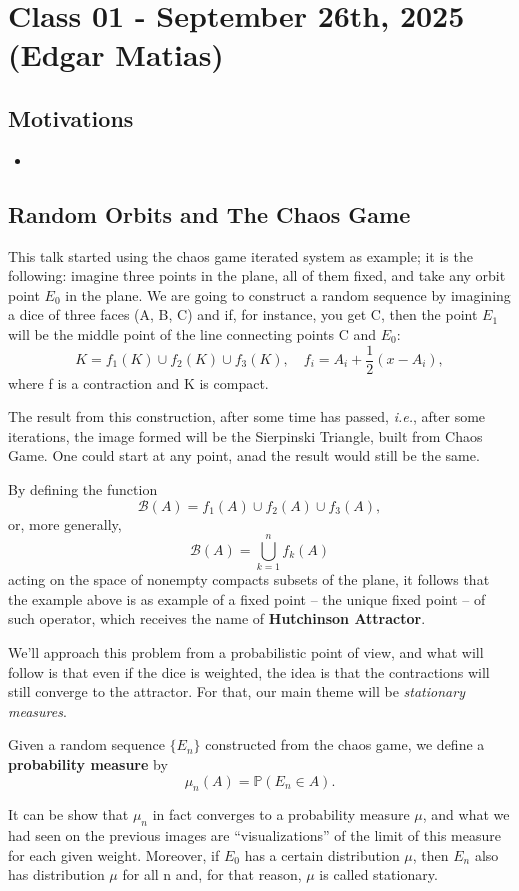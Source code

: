 \documentclass[../stationary_ifs.tex]{subfiles}
\begin{document}
\section{Class 01 - September 26th, 2025 (Edgar Matias)}
\subsection{Motivations}
\begin{itemize}
	\item
\end{itemize}
\subsection{Random Orbits and The Chaos Game}
This talk started using the chaos game iterated system as example; it is the following: imagine three points in the plane, all of them fixed,
and take any orbit point \(E_{0}\) in the plane. We are going to construct a random sequence by imagining a dice of three faces (A, B, C) and if, for instance, you get
C, then the point \(E_1\) will be the middle point of the line connecting points C and \(E_{0}\):
\[
	K =f_1(K)\cup f_2(K)\cup f_3(K),\quad f_{i} = A_{i}+\frac{1}{2}(x-A_{i}),
\]
where f is a contraction and K is compact.

The result from this construction, after some time has passed, \textit{i.e.}, after some iterations, the image formed will be the Sierpinski Triangle, built from Chaos Game.
One could start at any point, anad the result would still be the same.

By defining the function
\[
	\mathcal{B}(A) = f_1(A)\cup f_2(A)\cup f_3(A),
\]
or, more generally,
\[
	\mathcal{B}(A) = \bigcup_{k=1}^{n}f_{k}(A)
\]
acting on the space of nonempty compacts subsets of the plane, it follows that the example above is as example of a fixed point -- the unique fixed point -- of such operator,
which receives the name of \textbf{Hutchinson Attractor}.

We'll approach this problem from a probabilistic point of view, and what will follow is that even if the dice is weighted, the idea is that the contractions will still converge
to the attractor. For that, our main theme will be \textit{stationary measures}.

\begin{def*}
	Given a random sequence \(\{E_{n}\}\) constructed from the chaos game, we define a \textbf{probability measure} by
	\[
		\mu_{n}(A) = \mathbb{P}(E_{n}\in A).
	\]
\end{def*}
It can be show that \(\mu_{n}\) in fact converges to a probability measure \(\mu \), and what we had seen on the previous images are ``visualizations'' of the limit of this measure
for each given weight. Moreover, if \(E_{0}\) has a certain distribution \(\mu \), then \(E_{n}\) also has distribution \(\mu \) for all n and, for that reason, \(\mu \) is called stationary.
\end{document}
